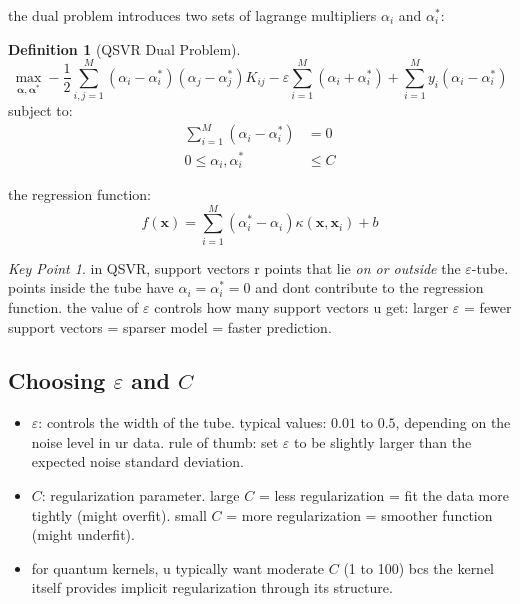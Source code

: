 \documentclass[11pt,a4paper]{article}
\theoremstyle{definition}
\newtheorem{definition}{Definition}[section]
\theoremstyle{remark}
\newtheorem*{keypoint}{Key Point}
\begin{document}
the dual problem introduces two sets of lagrange multipliers $\alpha_i$ and $\alpha_i^*$:

\begin{definition}[QSVR Dual Problem]
\[
\max_{\boldsymbol{\alpha}, \boldsymbol{\alpha}^*} -\frac{1}{2}\sum_{i,j=1}^M (\alpha_i - \alpha_i^*)(\alpha_j - \alpha_j^*) K_{ij} - \varepsilon \sum_{i=1}^M (\alpha_i + \alpha_i^*) + \sum_{i=1}^M y_i (\alpha_i - \alpha_i^*)
\]
subject to:
\begin{align}
\sum_{i=1}^M (\alpha_i - \alpha_i^*) &= 0 \\
0 \leq \alpha_i, \alpha_i^* &\leq C
\end{align}
\end{definition}

the regression function:
\[
f(\mathbf{x}) = \sum_{i=1}^M (\alpha_i^* - \alpha_i) \kappa(\mathbf{x}, \mathbf{x}_i) + b
\]

\begin{keypoint}
in QSVR, support vectors r points that lie \emph{on or outside} the $\varepsilon$-tube. points inside the tube have $\alpha_i = \alpha_i^* = 0$ and dont contribute to the regression function. the value of $\varepsilon$ controls how many support vectors u get: larger $\varepsilon$ = fewer support vectors = sparser model = faster prediction.
\end{keypoint}

\subsection{Choosing $\varepsilon$ and $C$}

\begin{itemize}[leftmargin=*]
    \item \textbf{$\varepsilon$}: controls the width of the tube. typical values: $0.01$ to $0.5$, depending on the noise level in ur data. rule of thumb: set $\varepsilon$ to be slightly larger than the expected noise standard deviation.

    \item \textbf{$C$}: regularization parameter. large $C$ = less regularization = fit the data more tightly (might overfit). small $C$ = more regularization = smoother function (might underfit).

    \item for quantum kernels, u typically want moderate $C$ (1 to 100) bcs the kernel itself provides implicit regularization through its structure.
\end{itemize}
\end{document}
